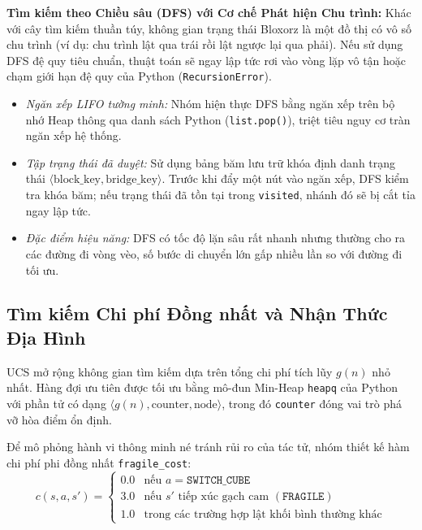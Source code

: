 \noindent
\textbf{Tìm kiếm theo Chiều sâu (DFS) với Cơ chế Phát hiện Chu trình:}
Khác với cây tìm kiếm thuần túy, không gian trạng thái Bloxorz là một đồ
thị có vô số chu trình (ví dụ: chu trình lật qua trái rồi lật ngược lại
qua phải). Nếu sử dụng DFS đệ quy tiêu chuẩn, thuật toán sẽ ngay lập tức rơi
vào vòng lặp vô tận hoặc chạm giới hạn đệ quy của Python
(\texttt{RecursionError}).
\begin{itemize}[--]
    \item \textit{Ngăn xếp LIFO tường minh:} Nhóm hiện thực DFS bằng
    ngăn xếp trên bộ nhớ Heap thông qua danh sách Python
    (\texttt{list.pop()}), triệt tiêu nguy cơ tràn ngăn xếp hệ thống.
    \item \textit{Tập trạng thái đã duyệt:} Sử dụng bảng băm lưu trữ khóa định
    danh trạng thái $\langle \text{block\_key}, \text{bridge\_key} \rangle$.
    Trước khi đẩy một nút vào ngăn xếp, DFS kiểm tra khóa băm; nếu trạng thái
    đã tồn tại trong \texttt{visited}, nhánh đó sẽ bị cắt tỉa ngay lập tức.
    \item \textit{Đặc điểm hiệu năng:} DFS có tốc độ lặn sâu rất nhanh nhưng
    thường cho ra các đường đi vòng vèo, số bước di chuyển lớn gấp nhiều lần
    so với đường đi tối ưu.
\end{itemize}

\subsection{Tìm kiếm Chi phí Đồng nhất và Nhận Thức Địa Hình}
\label{subsec:ucs_impl}
UCS mở rộng không gian tìm kiếm dựa trên tổng chi phí tích lũy $g(n)$ nhỏ nhất.
Hàng đợi ưu tiên được tối ưu bằng mô-đun Min-Heap \texttt{heapq} của Python
với phần tử có dạng $\langle g(n), \text{counter}, \text{node} \rangle$, trong
đó \texttt{counter} đóng vai trò phá vỡ hòa điểm ổn định.

Để mô phỏng hành vi thông minh né tránh rủi ro của tác tử, nhóm thiết
kế hàm chi phí phi đồng nhất \texttt{fragile\_cost}:
\begin{equation}
    c(s, a, s') =
    \begin{cases}
        0.0 & \text{nếu } a = \texttt{SWITCH\_CUBE} \\
        3.0 & \text{nếu } s' \text{ tiếp xúc gạch cam }
        (\texttt{FRAGILE}) \\
        1.0 & \text{trong các trường hợp lật khối bình thường khác}
    \end{cases}
    \label{eq:fragile_cost}
\end{equation}

